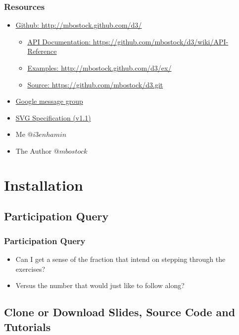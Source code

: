 \documentclass{beamer}
\begin{document}
\begin{frame}
    \frametitle{Resources}
\pause
        \begin{itemize}
        \item \href{http://mbostock.github.com/d3/}{\underline{Github}: http://mbostock.github.com/d3/}
\pause
            \begin{itemize}
            \item \href{https://github.com/mbostock/d3/wiki/API-Reference}{\underline{API Documentation}: https://github.com/mbostock/d3/wiki/API-Reference}
\pause
            \item \href{http://mbostock.github.com/d3/ex/}{\underline{Examples}: http://mbostock.github.com/d3/ex/}
\pause
            \item \href{https://github.com/mbostock/d3.git}{\underline{Source}: https://github.com/mbostock/d3.git}
            \end{itemize}
\pause
        \item \href{http://groups.google.com/group/d3-js?pli=1}{Google message group}
\pause
        \item \href{http://www.w3.org/TR/SVG/}{SVG Specification (v1.1)}
\pause
        \item Me $@i3enhamin$
        \item The Author $@mbostock$
        \end{itemize}
\end{frame}



\section{Installation}

\subsection{Participation Query}

\begin{frame}[fragile]
    \frametitle{Participation Query}
    \begin{itemize}
    \item Can I get a sense of the fraction that intend on stepping through the exercises?
\pause
    \item Versus the number that would just like to follow along?
    \end{itemize}
\end{frame}


\subsection{Clone or Download Slides, Source Code and Tutorials}
\end{document}

